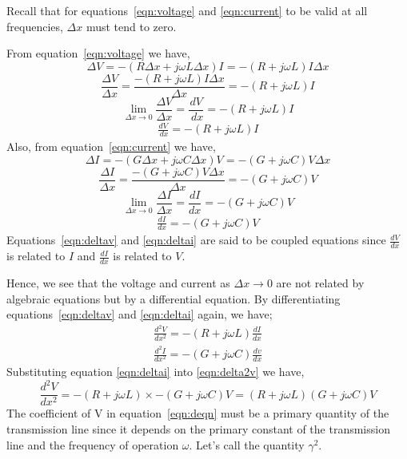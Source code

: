 Recall that for equations~\eqref{eqn:voltage} and \eqref{eqn:current} to be valid at all frequencies, $\Delta x$ must tend to zero.

From equation~\eqref{eqn:voltage} we have,
\begin{dmath*}
\Delta V = - (R \Delta x + j\omega L\Delta x)I = - (R + j\omega L)I\Delta x
\end{dmath*}
\begin{dmath*}
\frac{\Delta V }{\Delta x} = \frac{ - (R  + j\omega L)I\Delta x}{\Delta x} =  -(R  + j\omega L) I
\end{dmath*}
\[ \lim_{ \Delta x\to 0} \frac{\Delta V}{ \Delta x} = \frac{ dV}{ \ dx} = - (R + j \omega L)I \]
\begin{align}
\frac{ dV}{ \ dx} = - (R + j \omega L)I 
\label{eqn:deltav}
\end{align} 
Also, from equation~\eqref{eqn:current} we have,
\begin{dmath*}
\Delta I = - (G \Delta x + j\omega C\Delta x)V = - (G + j\omega C)V\Delta x
\end{dmath*}
\begin{dmath*}
\frac{	\Delta I }{\Delta x} = \frac{ - (G + j\omega C)V\Delta x}{\Delta x} =  - (G + j\omega C) V
\end{dmath*}
\[ \lim_{ \Delta x\to 0}	\frac{ \Delta I}{ \Delta x} = \frac{dI}{dx} = - (G + j\omega C)V \]
\begin{align}
\frac{dI}{dx} = - (G + j\omega C)V 
\label{eqn:deltai}
\end{align}
Equations~\eqref{eqn:deltav} and \eqref{eqn:deltai} are said to be coupled equations since $ \frac{dV}{dx} $ is related to $I$ and $ \frac{dI}{dx} $  is related to $V$.

Hence, we see that the voltage and current as $\Delta x \rightarrow 0$ are not related by algebraic equations but by a differential equation. By differentiating equations~\eqref{eqn:deltav} and \eqref{eqn:deltai} again, we have; 
\begin{align}
\frac{d^{2}V}{dx^{2}} = - (R + j\omega L)\frac{dI}{dx} 
\label{eqn:delta2v}
\end{align}
\begin{align}
\frac{d^{2}I}{dx^{2}} = - (G + j\omega C)\frac{dv}{dx}
\label{eqn:delta2i}
\end{align}
Substituting equation \eqref{eqn:deltai} into \eqref{eqn:delta2v} we have,
\begin{dmath}
\frac{d^{2}V}{dx^{2}} = - (R + j\omega L)\times -(G + j\omega C)V = (R + j\omega L)(G + j\omega C)V 
\label{eqn:deqn}
\end{dmath}   
The coefficient of V in equation~\ref{eqn:deqn} must be a primary quantity of the transmission line since it depends on the primary constant of the transmission line and the frequency of operation $ \omega$. Let's call the quantity $ \gamma^{2}. $ 

